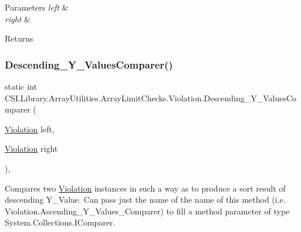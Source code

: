 \begin{DoxyParams}{Parameters}
{\em left} & \\
\hline
{\em right} & \\
\hline
\end{DoxyParams}
\begin{DoxyReturn}{Returns}

\end{DoxyReturn}
\mbox{\label{class_c_s_i_1_1_library_1_1_array_utilities_1_1_array_limit_checks_1_1_violation_a7c82d99abe8c6efbfcb6b7f58281c951}} 
\subsubsection{\texorpdfstring{Descending\_Y\_ValuesComparer()}{Descending\_Y\_ValuesComparer()}}
{\footnotesize\ttfamily static int C\+S\+I.\+Library.\+Array\+Utilities.\+Array\+Limit\+Checks.\+Violation.\+Descending\+\_\+\+Y\+\_\+\+Values\+Comparer (\begin{DoxyParamCaption}\item[{\mbox{\hyperlink{class_c_s_i_1_1_library_1_1_array_utilities_1_1_array_limit_checks_1_1_violation}{Violation}}}]{left,  }\item[{\mbox{\hyperlink{class_c_s_i_1_1_library_1_1_array_utilities_1_1_array_limit_checks_1_1_violation}{Violation}}}]{right }\end{DoxyParamCaption})\hspace{0.3cm}{\ttfamily [inline]}, {\ttfamily [static]}}



Compares two \mbox{\hyperlink{class_c_s_i_1_1_library_1_1_array_utilities_1_1_array_limit_checks_1_1_violation}{Violation}} instances in such a way as to produce a sort result of descending Y\+\_\+\+Value. Can pass just the name of the name of this method (i.\+e. Violation.\+Ascending\+\_\+\+Y\+\_\+\+Values\+\_\+\+Comparer) to fill a method parameter of type System.\+Collections.\+I\+Comparer. 


